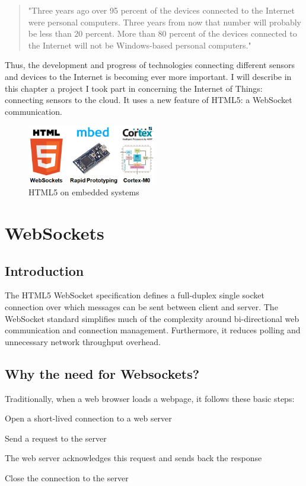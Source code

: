 \documentclass[pdftex,10pt,a4paper]{report}
\newenvironment{packed_item}{
\begin{itemize}
  \setlength{\itemsep}{1pt}
  \setlength{\parskip}{0pt}
  \setlength{\parsep}{0pt}
}{\end{itemize}}
\begin{document}
\begin{quote} "Three years ago over 95 percent of the devices connected to the Internet were personal computers. Three years from now that number will probably be less than 20 percent. More than 80 percent of the devices connected to the Internet will not be Windows-based personal computers." \\
\end{quote}

Thus, the development and progress of technologies connecting different sensors and devices to the Internet is becoming ever more important. I will describe in this chapter a project I took part in concerning the Internet of Things: connecting sensors to the cloud. It uses a new feature of HTML5: a WebSocket communication.


\begin{figure}[h!]
		\centering
		\includegraphics[width=0.5\textwidth]{./logo_ws.jpg}
		\caption{HTML5 on embedded systems}
		\label{HTML5 on embedded systems}
\end{figure}

\section{WebSockets}
\subsection{Introduction}
The HTML5 WebSocket specification defines a full-duplex single socket connection over which messages can be sent between client and server. The WebSocket standard simplifies much of the complexity around bi-directional web communication and connection management. Furthermore, it reduces polling and unnecessary network throughput overhead.

\subsection{Why the need for Websockets?}
Traditionally, when a web browser loads a webpage, it follows these basic steps:

\begin{packed_item}
	\item Open a short-lived connection to a web server
	\item Send a request to the server
	\item The web server acknowledges this request and sends back the response
	\item Close the connection to the server
\end{packed_item}
\end{document}
